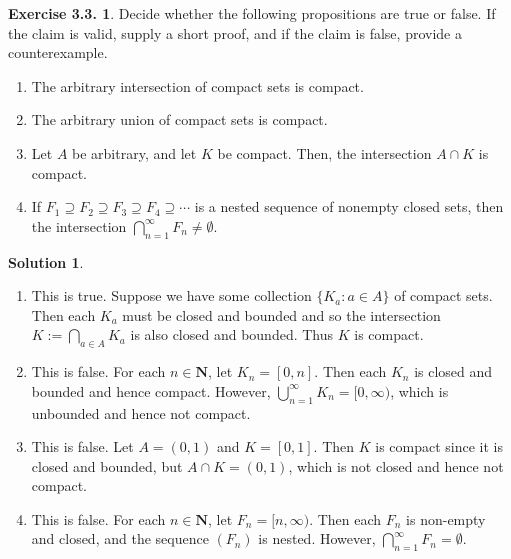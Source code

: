 \documentclass[12pt]{article}
\theoremstyle{definition}
\theoremstyle{exercise}
\newtheorem{exercise}{Exercise 3.3.}
\theoremstyle{solution}
\newtheorem*{solution}{Solution}
\newcommand{\N}{\mathbf{N}}
\begin{document}
\begin{exercise}
\label{ex:5}
    Decide whether the following propositions are true or false. If the claim is valid, supply a short proof, and if the claim is false, provide a counterexample.
    \begin{enumerate}
        \item The arbitrary intersection of compact sets is compact.

        \item The arbitrary union of compact sets is compact.

        \item Let \( A \) be arbitrary, and let \( K \) be compact. Then, the intersection \( A \cap K \) is compact.

        \item If \( F_1 \supseteq F_2 \supseteq F_3 \supseteq F_4 \supseteq \cdots \) is a nested sequence of nonempty closed sets, then the intersection \( \bigcap_{n=1}^{\infty} F_n \neq \emptyset \).
    \end{enumerate}
\end{exercise}

\begin{solution}
    \begin{enumerate}
        \item This is true. Suppose we have some collection \( \{ K_a : a \in A \} \) of compact sets. Then each \( K_a \) must be closed and bounded and so the intersection \( K := \bigcap_{a \in A} K_a \) is also closed and bounded. Thus \( K \) is compact.

        \item This is false. For each \( n \in \N \), let \( K_n = [0, n] \). Then each \( K_n \) is closed and bounded and hence compact. However, \( \bigcup_{n=1}^{\infty} K_n = [0, \infty) \), which is unbounded and hence not compact.

        \item This is false. Let \( A = (0, 1) \) and \( K = [0, 1] \). Then \( K \) is compact since it is closed and bounded, but \( A \cap K = (0, 1) \), which is not closed and hence not compact.

        \item This is false. For each \( n \in \N \), let \( F_n = [n, \infty) \). Then each \( F_n \) is non-empty and closed, and the sequence \( (F_n) \) is nested. However, \( \bigcap_{n=1}^{\infty} F_n = \emptyset \).
    \end{enumerate}
\end{solution}
\end{document}
